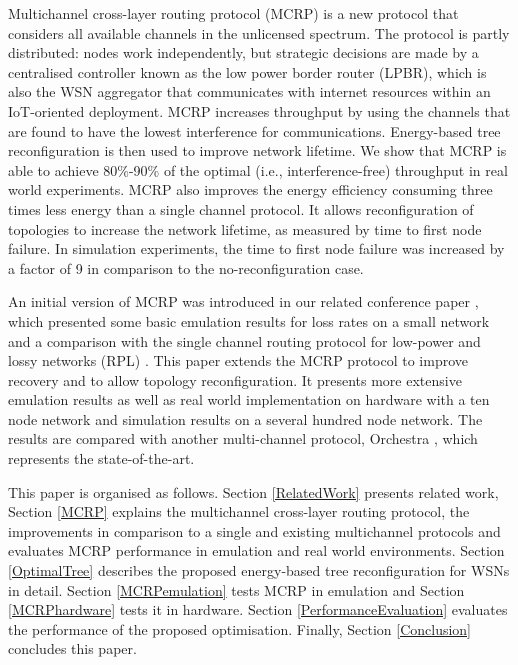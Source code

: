 Multichannel cross-layer routing protocol (MCRP) is a new protocol that considers all available channels in the unlicensed spectrum. The protocol is partly distributed: nodes work independently, but strategic decisions are made by a centralised controller known as the low power border router (LPBR), which is also the WSN aggregator that communicates with internet resources within an IoT-oriented deployment. MCRP increases throughput by using the channels that are found to have the lowest interference for communications.
Energy-based tree reconfiguration is then used to improve network lifetime.  We show that MCRP is able to achieve 80\%-90\% of the optimal (i.e., interference-free) throughput in real world experiments.
MCRP also improves the energy efficiency consuming three times less energy than a single channel protocol.  It allows reconfiguration of topologies to increase the network lifetime, as measured by time to first node failure.  In simulation experiments, the time to first node failure was increased by a factor of 9 in comparison to the no-reconfiguration case.

An initial version of MCRP was introduced in our related conference paper \cite{mcrp}, which presented some basic emulation results for loss rates on a small network and a comparison with the single channel routing protocol for low-power and lossy networks (RPL) \cite{winter2012rpl}.  This paper extends the MCRP protocol to improve recovery and to allow topology reconfiguration.  It presents more extensive emulation results as well as real world implementation on hardware with a ten node network and simulation results on a several hundred node network.  The results are compared with another multi-channel protocol, Orchestra \cite{orchestra}, which represents the state-of-the-art.

This paper is organised as follows. Section \ref{RelatedWork} presents  related work, Section \ref{MCRP} explains the multichannel cross-layer routing protocol, the improvements in comparison to a single and existing multichannel protocols and evaluates MCRP performance in emulation and real world environments.
Section \ref{OptimalTree} describes the proposed energy-based tree reconfiguration for WSNs in detail.  Section \ref{MCRPemulation} tests MCRP in emulation and Section \ref{MCRPhardware} tests it in hardware.
Section \ref{PerformanceEvaluation} evaluates the performance of the proposed optimisation. Finally, Section \ref{Conclusion} concludes this paper.
